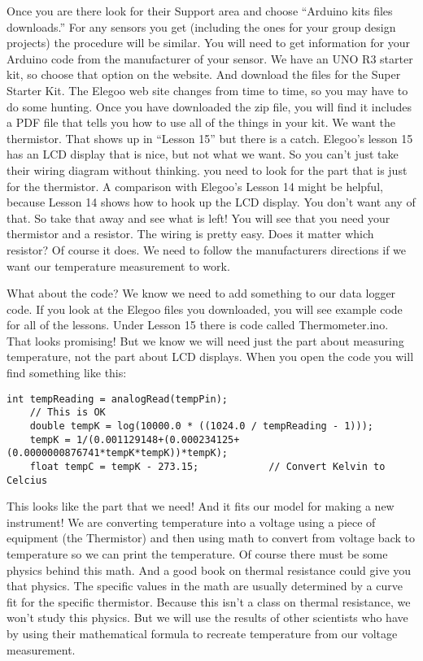 Once you are there look for their Support area and choose ``Arduino kits files downloads.'' For any sensors you get (including the ones for your group design projects) the procedure will be similar. You will need to get information for your Arduino code from the manufacturer of your sensor. We have an UNO R3 starter kit, so choose that option on the website.  And download the files for the Super Starter Kit.  The Elegoo web site changes from time to time, so you may have to do some hunting. Once you have downloaded the zip file, you will find it includes a PDF file that tells you how to use all of the things in your kit. We want the thermistor. That shows up in ``Lesson 15'' but there is a catch.  Elegoo's lesson 15 has an LCD display that is nice, but not what we want. So you can't just take their wiring diagram without thinking. you need to look for the part that is just for the thermistor.  A comparison with Elegoo's Lesson 14 might be helpful, because Lesson 14 shows how to hook up the LCD display.  You don't want any of that.  So take that away and see what is left!  You will see that you need your thermistor and a resistor. The wiring is pretty easy.  Does it matter which resistor?  Of course it does. We need to follow the manufacturers directions if we want our temperature measurement to work.  

What about the code?  We know we need to add something to our data logger code.  If you look at the Elegoo files you downloaded, you will see example code for all of the lessons.  Under Lesson 15 there is code called Thermometer.ino.  That looks promising!  But we know we will need just the part about measuring temperature, not the part about LCD displays.  When you open the code you will find something like this:


\begin{scriptsize}
\begin{lstlisting}[language=Arduino]
	int tempReading = analogRead(tempPin);
	// This is OK
	double tempK = log(10000.0 * ((1024.0 / tempReading - 1)));
	tempK = 1/(0.001129148+(0.000234125+(0.0000000876741*tempK*tempK))*tempK);
	float tempC = tempK - 273.15;            // Convert Kelvin to Celcius
\end{lstlisting}
\end{scriptsize}

This looks like the part that we need! And it fits our model for making a new instrument! We are converting temperature into a voltage using a piece of equipment (the Thermistor) and then using math to convert from voltage back to temperature so we can print the temperature. Of course there must be some physics behind this math. And a good book on thermal resistance could give you that physics. The specific values in the math are usually determined by a curve fit for the specific thermistor.  Because this isn't a class on thermal resistance, we won't study this physics. But we will use the results of other scientists who have by using their mathematical formula to recreate temperature from our voltage measurement.

